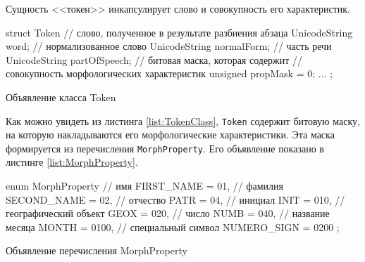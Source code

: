 Сущность <<токен>> инкапсулирует слово и совокупность его характеристик.
\begin{ListingEnv}
\begin{Verb}

struct Token {
    // слово, полученное в результате разбиения абзаца
    UnicodeString word;
    // нормализованное слово
    UnicodeString normalForm;
    // часть речи
    UnicodeString partOfSpeech;
    // битовая маска, которая содержит 
    // совокупность морфологических характеристик
    unsigned propMask = 0;
    ...
};
\end{Verb}
\caption{Объявление класса Token}
\label{list:TokenClass}
\end{ListingEnv}
Как можно увидеть из листинга \ref{list:TokenClass}, \lstinline{Token} содержит битовую маску, на которую накладываются его морфологические характеристики. Эта маска формируется из перечисления \lstinline{MorphProperty}. Его объявление показано в листинге \ref{list:MorphProperty}.
\begin{ListingEnv}
\begin{Verb}

enum MorphProperty {
    // имя
    FIRST_NAME = 01,
    // фамилия
    SECOND_NAME = 02,
    // отчество
    PATR = 04,
    // инициал
    INIT = 010,
    // географический объект
    GEOX = 020,
    // число
    NUMB = 040,
    // название месяца
    MONTH = 0100,
    // специальный символ
    NUMERO_SIGN = 0200
};

\end{Verb}
\caption{Объявление перечисления MorphProperty}
\label{list:MorphProperty}
\end{ListingEnv} 

